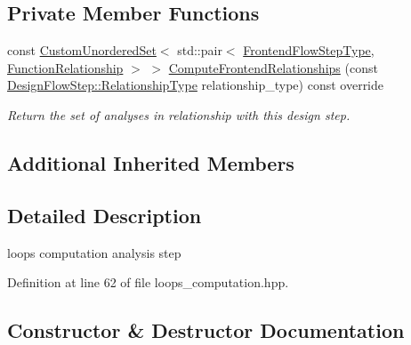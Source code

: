 \subsection*{Private Member Functions}
\begin{DoxyCompactItemize}
\item 
const \hyperlink{classCustomUnorderedSet}{Custom\+Unordered\+Set}$<$ std\+::pair$<$ \hyperlink{frontend__flow__step_8hpp_afeb3716c693d2b2e4ed3e6d04c3b63bb}{Frontend\+Flow\+Step\+Type}, \hyperlink{classFrontendFlowStep_af7cf30f2023e5b99e637dc2058289ab0}{Function\+Relationship} $>$ $>$ \hyperlink{classloops__computation_a37f11647b0d66f1f4df2354ef2bbaa0f}{Compute\+Frontend\+Relationships} (const \hyperlink{classDesignFlowStep_a723a3baf19ff2ceb77bc13e099d0b1b7}{Design\+Flow\+Step\+::\+Relationship\+Type} relationship\+\_\+type) const override
\begin{DoxyCompactList}\small\item\em Return the set of analyses in relationship with this design step. \end{DoxyCompactList}\end{DoxyCompactItemize}
\subsection*{Additional Inherited Members}


\subsection{Detailed Description}
loops computation analysis step 

Definition at line 62 of file loops\+\_\+computation.\+hpp.



\subsection{Constructor \& Destructor Documentation}
\mbox{\label{classloops__computation_ac4731d0cc3146dd896f9b38a73e37bde}} 
